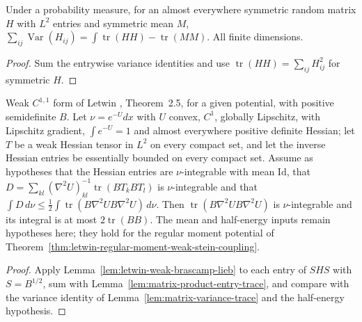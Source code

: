 \begin{lemma}
  \label{lem:matrix-variance-trace}
  \leanok
  Under a probability measure, for an almost everywhere symmetric random matrix $H$ with $L^2$ entries and symmetric mean $M$,
  $\sum_{ij}\operatorname{Var}(H_{ij})=\int\operatorname{tr}(HH)-\operatorname{tr}(MM)$. All finite dimensions.
\end{lemma}
\begin{proof}
  \leanok
  Sum the entrywise variance identities and use $\operatorname{tr}(HH)=\sum_{ij}H_{ij}^2$ for symmetric $H$.
\end{proof}

\begin{theorem}
  \label{thm:letwin-weak-hessian-trace-bound}
  \leanok
  Weak $C^{1,1}$ form of Letwin \cite{Letwin2026QuadraticKLS}, Theorem~2.5, for a given potential, with positive semidefinite $B$. Let
  $\nu=e^{-U}dx$ with $U$ convex, $C^1$, globally Lipschitz, with Lipschitz gradient, $\int e^{-U}=1$ and almost everywhere positive
  definite Hessian; let $T$ be a weak Hessian tensor in $L^2$ on every compact set, and let the inverse Hessian entries be essentially
  bounded on every compact set. Assume as hypotheses that the Hessian entries are $\nu$-integrable with mean $\mathrm{Id}$, that
  $D=\sum_{kl}(\nabla^2U)^{-1}_{kl}\operatorname{tr}(BT_kBT_l)$ is $\nu$-integrable and that
  $\int D\,d\nu\le\frac12\int\operatorname{tr}(B\nabla^2UB\nabla^2U)\,d\nu$. Then $\operatorname{tr}(B\nabla^2UB\nabla^2U)$ is
  $\nu$-integrable and its integral is at most $2\operatorname{tr}(BB)$. The mean and half-energy inputs remain hypotheses here;
  they hold for the regular moment potential of Theorem~\ref{thm:letwin-regular-moment-weak-stein-coupling}.
\end{theorem}
\begin{proof}
  \leanok
  Apply Lemma~\ref{lem:letwin-weak-brascamp-lieb} to each entry of $SHS$ with $S=B^{1/2}$, sum with Lemma~\ref{lem:matrix-product-entry-trace},
  and compare with the variance identity of Lemma~\ref{lem:matrix-variance-trace} and the half-energy hypothesis.
\end{proof}

